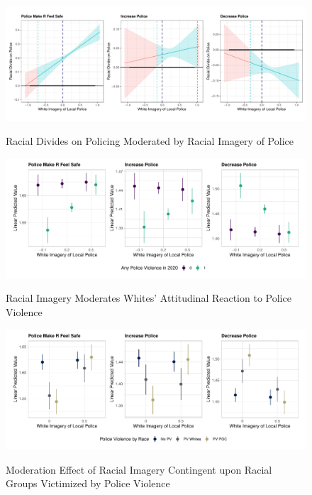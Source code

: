 \begin{figure}[t]  \centering
    \caption{Racial Divides on Policing Moderated by Racial Imagery of Police}
	\includegraphics[width = \linewidth]{figures/divide moderation}
    \label{fig:divides}
    \fnote{}
\end{figure}

\begin{figure}[t]  \centering
    \caption{Racial Imagery Moderates Whites' Attitudinal Reaction to Police Violence}
	\includegraphics[width = \linewidth]{figures/reaction moderation}
    \label{fig:moderation}
    \fnote{}
\end{figure}

\begin{figure}[t]  \centering
    \caption{Moderation Effect of Racial Imagery Contingent upon Racial Groups Victimized by Police Violence}
	\includegraphics[width = \linewidth]{figures/racial component}
    \label{fig:racial component}
    \fnote{}
\end{figure}









